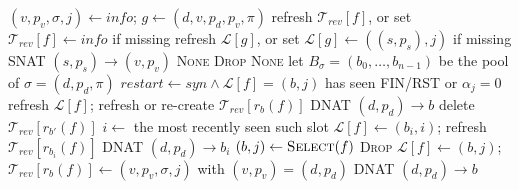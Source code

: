 \documentclass[conference]{IEEEtran}
\begin{document}
\begin{algorithm}[t]
\caption{\textsc{LoadBalance}$(f, \rho, \textit{syn}, \textit{kind}, \textit{info})$, $f=(s,d,p_s,p_d,\pi)$}
\label{alg:lb}
\begin{algorithmic}[1]
  \STATE $(v,p_v,\sigma,j) \gets \textit{info}$;
         $g \gets (d, v, p_d, p_v, \pi)$ 
  \STATE refresh $\mathcal{T}_{rev}[f]$, or set $\mathcal{T}_{rev}[f] \gets \textit{info}$ if missing
  \STATE refresh $\mathcal{L}[g]$, or set $\mathcal{L}[g] \gets ((s,p_s), j)$ if missing
  \RETURN SNAT $(s,p_s) \to (v,p_v)$
\ENDIF
{}
  \RETURN \textsc{None}
\ENDIF
{}
    \RETURN \textsc{Drop} 
  \ENDIF
  \RETURN \textsc{None}
\ENDIF
\STATE let $B_\sigma=(b_0,\dots,b_{n-1})$ be the pool of $\sigma=(d,p_d,\pi)$
\STATE $\textit{restart} \gets \textit{syn} \land \mathcal{L}[f]=(b,j)$ has seen FIN/RST or $\alpha_j=0$
  \STATE refresh $\mathcal{L}[f]$; refresh or re-create $\mathcal{T}_{rev}[r_b(f)]$
  \RETURN DNAT $(d,p_d) \to b$
  \STATE delete $\mathcal{T}_{rev}[r_{b'}(f)]$ 
  \STATE $i \gets$ the most recently seen such slot
  \STATE $\mathcal{L}[f] \gets (b_i,i)$; refresh $\mathcal{T}_{rev}[r_{b_i}(f)]$ 
  \RETURN DNAT $(d,p_d) \to b_i$
\ENDIF
\STATE $(b,j) \gets \textsc{Select}(f)$ 
  \RETURN \textsc{Drop} 
\ENDIF
\STATE $\mathcal{L}[f] \gets (b,j)$;
       $\mathcal{T}_{rev}[r_b(f)] \gets (v,p_v,\sigma,j)$ with $(v,p_v)=(d,p_d)$
\RETURN DNAT $(d,p_d) \to b$
\end{algorithmic}
\end{algorithm}
\end{document}
